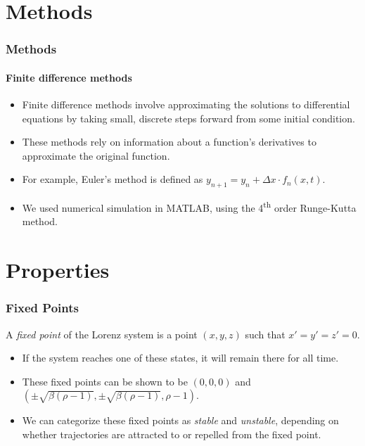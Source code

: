 \documentclass{beamer}
\begin{document}

\section{Methods}

\begin{frame}
    \frametitle{Methods}
    \framesubtitle{Finite difference methods}
    \begin{itemize}
        \item{Finite difference methods involve approximating the solutions to differential equations by taking small, discrete steps forward from some initial condition.}
        \item{These methods rely on information about a function's derivatives to approximate the original function.}
        \item{For example, Euler's method is defined as $y_{n+1} = y_n + \Delta x \cdot f_n(x,t)$.} %
        \item{We used numerical simulation in MATLAB, using the 4\textsuperscript{th} order Runge-Kutta method.}
    \end{itemize}
\end{frame}


\section{Properties}

\begin{frame}
    \frametitle{Fixed Points}

    A \textit{fixed point} of the Lorenz system is a point $(x, y, z)$ such that $x' = y' = z' = 0$. 

    \bigskip

    \begin{itemize}
    \item{If the system reaches one of these states, it will remain there for all time.}
    \item{These fixed points can be shown to be $(0, 0, 0)$ and $\left(\pm\sqrt{\beta(\rho-1)}, \pm\sqrt{\beta(\rho-1)},\rho-1\right)$.}
    \item{We can categorize these fixed points as \textit{stable} and \textit{unstable}, depending on whether trajectories are attracted to or repelled from the fixed point.}
    \end{itemize}

\end{frame}
\end{document}
